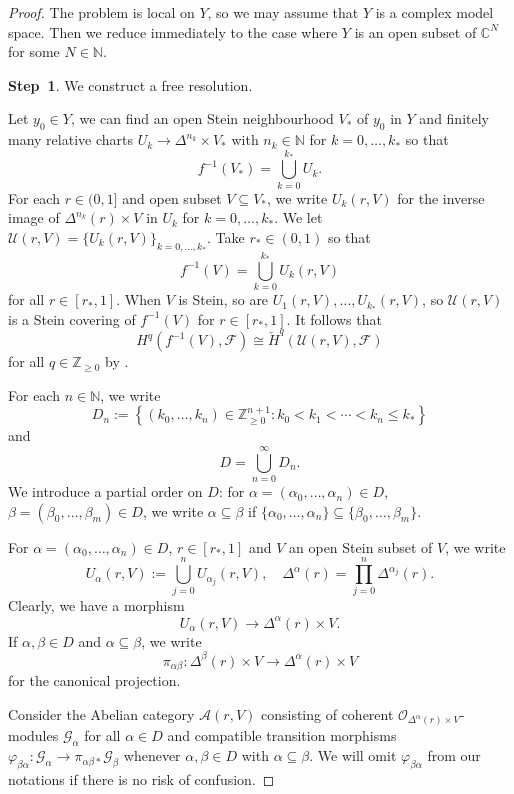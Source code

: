 \begin{proof}
    The problem is local on $Y$, so we may assume that $Y$ is a complex model space. Then we reduce immediately to the case where $Y$ is an open subset of $\mathbb{C}^N$ for some $N\in \mathbb{N}$.

    \textbf{Step~1}. We construct a free resolution.

    Let $y_0\in Y$, we can find an open Stein neighbourhood $V_*$ of $y_0$ in $Y$ and finitely many relative charts $U_k\rightarrow \Delta^{n_k} \times V_*$ with $n_k\in \mathbb{N}$ for $k=0,\ldots,k_*$ so that 
    \[
        f^{-1}(V_*)=\bigcup_{k=0}^{k_*}U_k.  
    \]
    For each $r\in (0,1]$ and open subset $V\subseteq V_*$, we write $U_k(r,V)$ for the inverse image of $\Delta^{n_k}(r)\times V$ in $U_k$ for $k=0,\ldots,k_*$. We let $\mathcal{U}(r,V)=\{U_k(r,V)\}_{k=0,\ldots,k_*}$. Take $r_*\in (0,1)$ so that
    \[
        f^{-1}(V)=\bigcup_{k=0}^{k_*} U_k(r,V)  
    \]
    for all $r\in [r_*,1]$. When $V$ is Stein, so are $U_1(r,V),\ldots,U_{k_*}(r,V)$, so $\mathcal{U}(r,V)$ is a Stein covering of $f^{-1}(V)$ for $r\in [r_*,1]$. It follows that 
    \[
        H^q(f^{-1}(V),\mathcal{F})\cong \check{H}^q(\mathcal{U}(r,V),\mathcal{F})
    \]
    for all $q\in \mathbb{Z}_{\geq 0}$ by \cite[\href{https://stacks.math.columbia.edu/tag/03OW}{Tag 03OW}]{stacks-project}.
     
    For each $n\in \mathbb{N}$, we write
    \[
        D_n:=\left\{ (k_0,\ldots,k_n)\in \mathbb{Z}_{\geq 0}^{n+1}: k_0<k_1<\cdots<k_n\leq k_* \right\}
    \]
    and
    \[
        D=\bigcup_{n=0}^{\infty}D_n.  
    \]
    We introduce a partial order on $D$: for $\alpha=(\alpha_0,\ldots,\alpha_n)\in D$, $\beta=(\beta_0,\ldots,\beta_m)\in D$, we write $\alpha\subseteq \beta$ if $\{\alpha_0,\ldots,\alpha_n\}\subseteq \{\beta_0,\ldots,\beta_m\}$. 
    
    For $\alpha=(\alpha_0,\ldots,\alpha_n)\in D$, $r\in [r_*,1]$ and $V$ an open Stein subset of $V$, we write
    \[
        U_{\alpha}(r,V):=\bigcup_{j=0}^n U_{\alpha_j}(r,V),\quad \Delta^{\alpha}(r)=\prod_{j=0}^n \Delta^{\alpha_j}(r).
    \]
    Clearly, we have a morphism
    \[
        U_{\alpha}(r,V)\rightarrow \Delta^{\alpha}(r)\times V.  
    \]
    If $\alpha,\beta\in D$ and $\alpha\subseteq \beta$, we write
    \[
        \pi_{\alpha\beta}: \Delta^{\beta}(r)\times V\rightarrow  \Delta^{\alpha}(r)\times V
    \]
    for the canonical projection. 
    
    Consider the Abelian category $\mathcal{A}(r,V)$ consisting of coherent $\mathcal{O}_{ \Delta^{\alpha}(r)\times V}$-modules $\mathcal{G}_{\alpha}$ for all $\alpha\in D$ and compatible transition morphisms $\varphi_{\beta\alpha}:\mathcal{G}_{\alpha}\rightarrow \pi_{\alpha\beta*}\mathcal{G}_{\beta}$ whenever $\alpha,\beta\in D$ with $\alpha\subseteq \beta$. We will omit $\varphi_{\beta\alpha}$ from our notations if there is no risk of confusion.


\end{proof}
